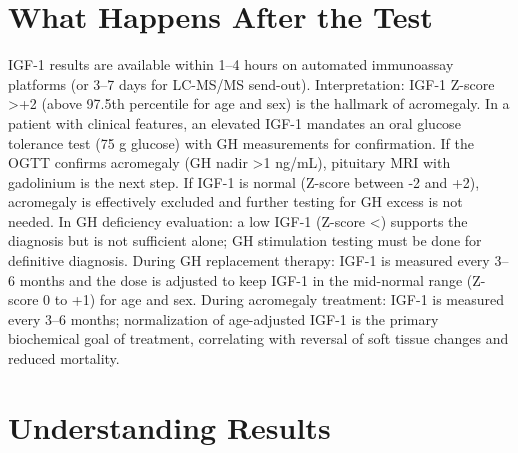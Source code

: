 \section*{What Happens After the Test}
IGF-1 results are available within 1--4 hours on automated immunoassay platforms (or 3--7 days for LC-MS/MS send-out). Interpretation: IGF-1 Z-score >+2 (above 97.5th percentile for age and sex) is the hallmark of acromegaly. In a patient with clinical features, an elevated IGF-1 mandates an oral glucose tolerance test (75 g glucose) with GH measurements for confirmation. If the OGTT confirms acromegaly (GH nadir >1 ng/mL), pituitary MRI with gadolinium is the next step. If IGF-1 is normal (Z-score between -2 and +2), acromegaly is effectively excluded and further testing for GH excess is not needed. In GH deficiency evaluation: a low IGF-1 (Z-score <) supports the diagnosis but is not sufficient alone; GH stimulation testing must be done for definitive diagnosis. During GH replacement therapy: IGF-1 is measured every 3--6 months and the dose is adjusted to keep IGF-1 in the mid-normal range (Z-score 0 to +1) for age and sex. During acromegaly treatment: IGF-1 is measured every 3--6 months; normalization of age-adjusted IGF-1 is the primary biochemical goal of treatment, correlating with reversal of soft tissue changes and reduced mortality.

\section*{Understanding Results}

